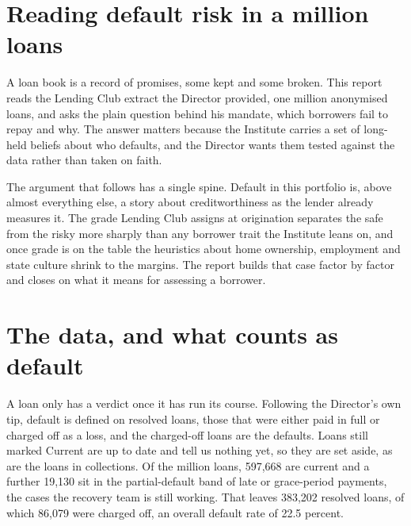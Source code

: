 \documentclass[11pt,preprint]{elsarticle}
\numberwithin{equation}{section}
\numberwithin{figure}{section}
\numberwithin{table}{section}
\begin{document}
\headsep 35pt %




\newpage

\section*{Reading default risk in a million
loans}\label{reading-default-risk-in-a-million-loans}

A loan book is a record of promises, some kept and some broken. This
report reads the Lending Club extract the Director provided, one million
anonymised loans, and asks the plain question behind his mandate, which
borrowers fail to repay and why. The answer matters because the
Institute carries a set of long-held beliefs about who defaults, and the
Director wants them tested against the data rather than taken on faith.

The argument that follows has a single spine. Default in this portfolio
is, above almost everything else, a story about creditworthiness as the
lender already measures it. The grade Lending Club assigns at
origination separates the safe from the risky more sharply than any
borrower trait the Institute leans on, and once grade is on the table
the heuristics about home ownership, employment and state culture shrink
to the margins. The report builds that case factor by factor and closes
on what it means for assessing a borrower.

\section*{The data, and what counts as
default}\label{the-data-and-what-counts-as-default}

A loan only has a verdict once it has run its course. Following the
Director's own tip, default is defined on resolved loans, those that
were either paid in full or charged off as a loss, and the charged-off
loans are the defaults. Loans still marked Current are up to date and
tell us nothing yet, so they are set aside, as are the loans in
collections. Of the million loans, 597,668 are current and a further
19,130 sit in the partial-default band of late or grace-period payments,
the cases the recovery team is still working. That leaves 383,202
resolved loans, of which 86,079 were charged off, an overall default
rate of 22.5 percent.
\end{document}
